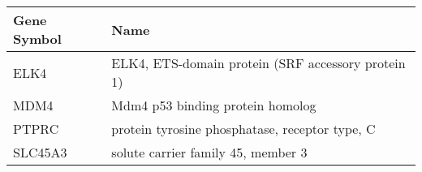 \begin{tabular}{ll}
\toprule
Gene Symbol &                                               Name \\
\midrule
       ELK4 & ELK4, ETS-domain protein (SRF accessory protein 1) \\
       MDM4 &                   Mdm4 p53 binding protein homolog \\
      PTPRC &     protein tyrosine phosphatase, receptor type, C \\
    SLC45A3 &                 solute carrier family 45, member 3 \\
\bottomrule
\end{tabular}
